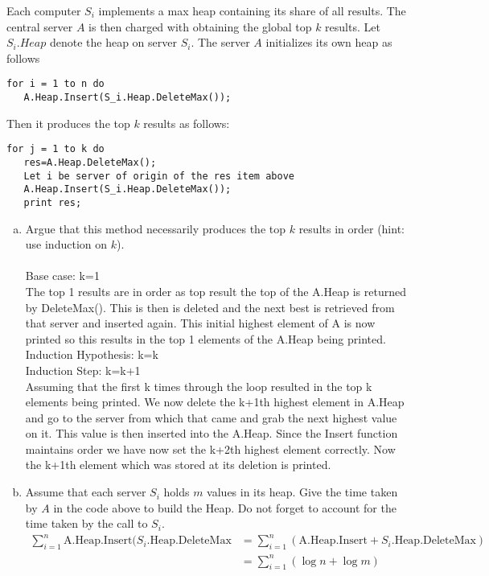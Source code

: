 \documentclass[12pt]{article}
\begin{document}
Each computer $S_i$ implements a max heap containing its share of all results. The
central server $A$ is then charged with obtaining the global top $k$ results. Let $S_i.Heap$ denote the heap on server
$S_i$. The server $A$ initializes its own heap as follows

\begin{verbatim}
for i = 1 to n do
   A.Heap.Insert(S_i.Heap.DeleteMax());
\end{verbatim}
Then it produces the top $k$ results as follows:

\begin{verbatim}
for j = 1 to k do
   res=A.Heap.DeleteMax();
   Let i be server of origin of the res item above
   A.Heap.Insert(S_i.Heap.DeleteMax());
   print res;
\end{verbatim}
\begin{enumerate}[(a)]
\item Argue that this method necessarily produces the top $k$ results in order
(hint: use induction on $k$).\\\\
Base case: k=1\\
    The top 1 results are in order as  top result the top of the A.Heap is returned by DeleteMax(). This is then is deleted and the next best is retrieved from that server and inserted again. This initial highest element of A is now printed so this results in the top 1 elements of the A.Heap being printed.
Induction Hypothesis: k=k\\
Induction Step: k=k+1\\
    Assuming that the first k times through the loop resulted in the top k elements being printed. We now delete the k+1th highest element in A.Heap and go to the server from which that came and grab the next highest value on it. This value is then inserted into the A.Heap. Since the Insert function maintains order we have now set the k+2th highest element correctly. Now the k+1th element which was stored at its deletion is printed.
\item Assume that each server $S_i$ holds $m$ values in its heap. Give the time taken
by $A$ in the code above to build the Heap. Do not forget to account for the time
taken by the call to $S_i$.
\begin{align*}
\displaystyle\sum_{i=1}^n \text{A.Heap.Insert($S_i$.Heap.DeleteMax} &= \displaystyle\sum_{i=1}^n  (\text{A.Heap.Insert} + \text{$S_i$.Heap.DeleteMax}  )\\
&= \displaystyle\sum_{i=1}^n (\log n + \log m )\\

\end{align*}
\end{enumerate}
\end{document}
